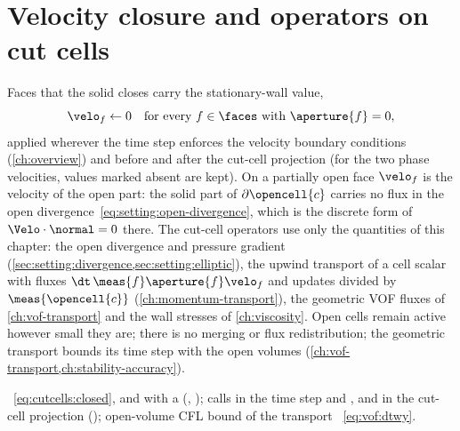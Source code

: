 \section{Velocity closure and operators on cut cells}\label{sec:cutcells:operators}
Faces that the solid closes carry the stationary-wall value,
\begin{equation}\label{eq:cutcells:closed}
  \velo_f\leftarrow0\quad\text{for every }f\in\faces\text{ with }\aperture{f}=0,
\end{equation}
applied wherever the time step enforces the velocity boundary conditions
(\cref{ch:overview}) and before and after the cut-cell projection (for the two
phase velocities, values marked absent are kept). On a partially open face $\velo_f$
is the velocity of the open part: the solid part of $\partial\opencell{c}$
carries no flux in the open divergence~\cref{eq:setting:open-divergence},
which is the discrete form of $\Velo\cdot\normal=0$ there. The cut-cell
operators use only the quantities of this chapter: the open divergence and
pressure gradient (\cref{sec:setting:divergence,sec:setting:elliptic}), the
upwind transport of a cell scalar with fluxes
$\dt\,\meas{f}\aperture{f}\velo_f$ and updates divided by $\meas{\opencell{c}}$
(\cref{ch:momentum-transport}), the geometric VOF fluxes of
\cref{ch:vof-transport} and the wall stresses of \cref{ch:viscosity}. Open
cells remain active however small they are; there is no merging or flux
redistribution; the geometric transport bounds its time step with the open
volumes (\cref{ch:vof-transport,ch:stability-accuracy}).

\begin{implnote}
~\cref{eq:cutcells:closed},
 and  with a 
(,
); calls in the time step
and ,
and in the cut-cell projection 
(); open-volume CFL bound of the
transport ~\cref{eq:vof:dtwy}.
\end{implnote}

